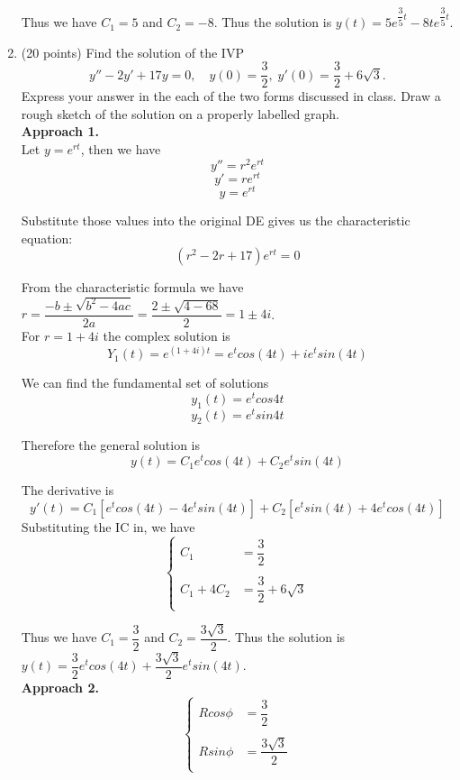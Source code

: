 \begin{enumerate}
Thus we have $C_1 = 5$ and $C_2 = -8$. Thus the solution is $y(t) = 5e^{\dfrac{3}{5}t}-8te^{\dfrac{3}{5}t}$.

\item (20 points)  Find the solution of the IVP
\begin{equation*}
y''-2y'+17y=0, \quad y(0)=\frac{3}{2}, \; y'(0)=\frac{3}{2} + 6\sqrt 3.
\end{equation*}
Express your answer in the each of the two forms discussed in class.  Draw a rough sketch of the solution on a properly labelled graph.\\

\noindent \textbf{Approach 1.}\\
Let $y = e^{rt}$, then we have $$y'' = r^2e^{rt}$$ $$y' = re^{rt}$$  $$y = e^{rt}$$

Substitute those values into the original DE gives us the characteristic equation: $$(r^2-2r+17)e^{rt} = 0$$

From the characteristic formula we have $r = \dfrac{-b \pm \sqrt{b^2 - 4ac}}{2a}=\dfrac{2 \pm \sqrt{4-68}}{2} = 1 \pm 4i$.\\
For $r = 1 + 4i$ the complex solution is 
$$Y_1(t) = e^{(1+4i)t}=e^{t}cos(4t)+ie^{t}sin(4t)$$

We can find the fundamental set of solutions $$y_1(t) = e^tcos4t$$ $$y_2(t) = e^tsin4t$$

Therefore the general solution is $$y(t) = C_1e^tcos(4t)+ C_2e^tsin(4t)$$

The derivative is $$y'(t) = C_1[e^tcos(4t)-4e^tsin(4t)]+C_2[e^tsin(4t)+4e^tcos(4t)]$$
Substituting the IC in, we have 
\begin{equation*}
	\begin{cases}
		C_1 &= \dfrac{3}{2}\\
		\\
		C_1 + 4C_2 &= \dfrac{3}{2}+6\sqrt{3}\\
	\end{cases}
\end{equation*}

Thus we have $C_1 = \dfrac{3}{2}$ and $C_2 = \dfrac{3 \sqrt{3}}{2}$. Thus the solution is $y(t) = \dfrac{3}{2}e^tcos(4t)+ \dfrac{3 \sqrt{3}}{2}e^tsin(4t)$.\\

\textbf{Approach 2.}
\begin{equation*}
	\begin{cases}
		R cos \phi &= \dfrac{3}{2}\\
		\\
		R sin \phi &= \dfrac{3 \sqrt{3}}{2}\\
	\end{cases}
\end{equation*}


\end{enumerate}
